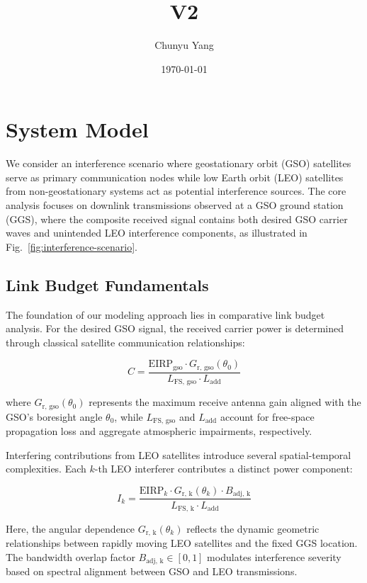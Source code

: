 \documentclass[12pt]{article}
\title{V2}
\author{Chunyu Yang}
\date{\today}
\begin{document}
\maketitle

\section{System Model}
\label{sec:system_model}

We consider an interference scenario where geostationary orbit (GSO) satellites serve as primary communication nodes while low Earth orbit (LEO) satellites from non-geostationary systems act as potential interference sources. The core analysis focuses on downlink transmissions observed at a GSO ground station (GGS), where the composite received signal contains both desired GSO carrier waves and unintended LEO interference components, as illustrated in Fig.~\ref{fig:interference-scenario}.

\subsection{Link Budget Fundamentals}
The foundation of our modeling approach lies in comparative link budget analysis. For the desired GSO signal, the received carrier power is determined through classical satellite communication relationships:

\begin{equation}
    C = \frac{\text{EIRP}_{\text{gso}} \cdot G_{\text{r, gso}}(\theta_0)}{L_{\text{FS, gso}} \cdot L_{\text{add}}}
\end{equation}

where $G_{\text{r, gso}}(\theta_0)$ represents the maximum receive antenna gain aligned with the GSO's boresight angle $\theta_0$, while $L_{\text{FS, gso}}$ and $L_{\text{add}}$ account for free-space propagation loss and aggregate atmospheric impairments, respectively.

Interfering contributions from LEO satellites introduce several spatial-temporal complexities. Each $k$-th LEO interferer contributes a distinct power component:

\begin{equation}
    I_k = \frac{\text{EIRP}_k \cdot G_{\text{r, k}}(\theta_k) \cdot B_{\text{adj, k}}}{L_{\text{FS, k}} \cdot L_{\text{add}}}
\end{equation}

Here, the angular dependence $G_{\text{r, k}}(\theta_k)$ reflects the dynamic geometric relationships between rapidly moving LEO satellites and the fixed GGS location. The bandwidth overlap factor $B_{\text{adj, k}} \in [0,1]$ modulates interference severity based on spectral alignment between GSO and LEO transmissions.
\end{document}
